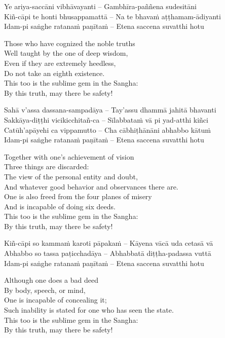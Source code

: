Ye ariya-saccāni vibhāvayanti – Gambhīra-paññena sudesitāni\\
Kiñ-cāpi te honti bhusappamattā – Na te bhavaṁ aṭṭhamam-ādiyanti\\
Idam-pi saṅghe ratanaṁ paṇītaṁ – Etena saccena suvatthi hotu

\begin{english}
  Those who have cognized the noble truths\\
  Well taught by the one of deep wisdom,\\
  Even if they are extremely heedless,\\
  Do not take an eighth existence.\\
  This too is the sublime gem in the Sangha:\\
  By this truth, may there be safety!
\end{english}

Sahā v'assa dassana-sampadāya – Tay'assu dhammā jahitā bhavanti\\
Sakkāya-diṭṭhi vicikicchitañ-ca – Sīlabbataṁ vā pi yad-atthi kiñci\\
Catūh'apāyehi ca vippamutto – Cha cābhiṭhānāni abhabbo kātuṁ\\
Idam-pi saṅghe ratanaṁ paṇītaṁ – Etena saccena suvatthi hotu

\begin{english}
  Together with one's achievement of vision\\
  Three things are discarded:\\
  The view of the personal entity and doubt,\\
  And whatever good behavior and observances there are.\\
  One is also freed from the four planes of misery\\
  And is incapable of doing six deeds.\\
  This too is the sublime gem in the Sangha:\\
  By this truth, may there be safety!
\end{english}

Kiñ-cāpi so kammaṁ karoti pāpakaṁ – Kāyena vācā uda cetasā vā\\
Abhabbo so tassa paṭicchadāya – Abhabbatā diṭṭha-padassa vuttā\\
Idam-pi saṅghe ratanaṁ paṇītaṁ – Etena saccena suvatthi hotu

\begin{english}
  Although one does a bad deed\\
  By body, speech, or mind,\\
  One is incapable of concealing it;\\
  Such inability is stated for one who has seen the state.\\
  This too is the sublime gem in the Sangha:\\
  By this truth, may there be safety!
\end{english}

